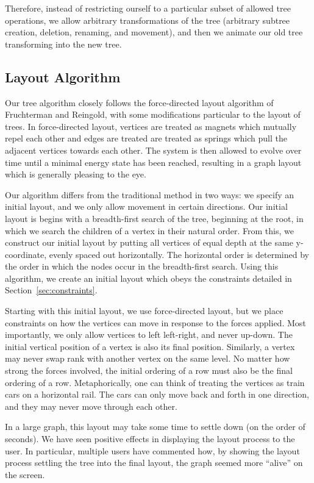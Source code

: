 \documentclass{article}
\begin{document}
Therefore, instead of restricting ourself to a particular subset of allowed
tree operations, we allow arbitrary transformations of the tree (arbitrary subtree creation, deletion, renaming, and movement), and then we
animate our old tree transforming into the new tree.  

\subsection{Layout Algorithm}

Our tree algorithm closely follows the force-directed layout algorithm of Fruchterman and Reingold\cite{fdp}, with some modifications particular to the layout of trees.  In force-directed layout, vertices are treated as magnets which mutually repel each other and edges are treated are treated as springs which pull the adjacent vertices towards each other.  The system is then allowed to evolve over time until a minimal energy state has been reached, resulting in a graph layout which is generally pleasing to the eye\cite{Cohen}.

Our algorithm differs from the traditional method in two ways: we specify an initial layout, and we only allow movement in certain directions.  Our initial layout is begins with a breadth-first search of the tree, beginning at the root, in which we search the children of a vertex in their natural order.  From this, we construct our initial layout by putting all vertices of equal depth at the same y-coordinate, evenly spaced out horizontally.  The horizontal order is determined by the order in which the nodes occur in the breadth-first search.
Using this algorithm, we create an initial layout which obeys the constraints detailed in Section~\ref{sec:constraints}.

Starting with this initial layout, we use force-directed layout, but we place
constraints on how the vertices can move in response to the forces applied.
Most importantly, we only allow vertices to left left-right, and never
up-down.  The initial vertical position of a vertex is also its final
position.  Similarly, a vertex may never swap rank with another vertex on the
same level. No matter how strong the forces involved, the initial ordering
of a row must also be the final ordering of a row.  Metaphorically, one can
think of treating the vertices as train cars on a horizontal rail.  The cars
can only move back and forth in one direction, and they may never move through
each other.

In a large graph, this layout may take some time to settle down (on the order
of seconds).  We have seen positive effects in displaying the layout process to
the user.  In particular, multiple users have commented how, by showing the
layout process settling the tree into the final layout, the graph seemed more
``alive'' on the screen. 
\end{document}
